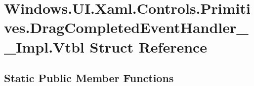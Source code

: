 \hypertarget{struct_windows_1_1_u_i_1_1_xaml_1_1_controls_1_1_primitives_1_1_drag_completed_event_handler_____impl_1_1_vtbl}{}\section{Windows.\+U\+I.\+Xaml.\+Controls.\+Primitives.\+Drag\+Completed\+Event\+Handler\+\_\+\+\_\+\+Impl.\+Vtbl Struct Reference}
\label{struct_windows_1_1_u_i_1_1_xaml_1_1_controls_1_1_primitives_1_1_drag_completed_event_handler_____impl_1_1_vtbl}
\subsection*{Static Public Member Functions}
